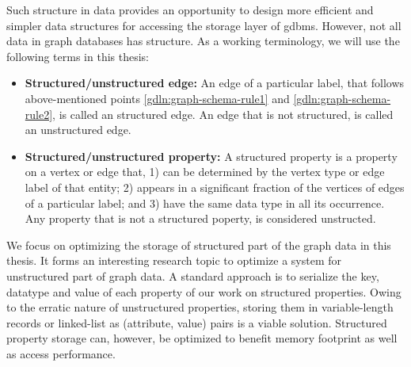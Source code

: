 \begin{guideline}
\begin{enumerate}
\end{enumerate}

Such structure in data provides an opportunity to design more efficient and simpler data structures for accessing the storage layer of \gls{gdbms}. However, not all data in graph databases has structure. As a working terminology, we will use the following terms in this thesis:

\begin{itemize}
	\item \textbf{Structured/unstructured edge:} An edge of a particular label, that follows above-mentioned points \ref{gdln:graph-schema-rule1} and \ref{gdln:graph-schema-rule2}, is called an structured edge. An edge that is not structured, is called an unstructured edge.
	 
	\item \textbf{Structured/unstructured property:} A structured property is a property on a vertex or edge that, 1) can be determined by the vertex type or edge label of that entity; 2) appears in a significant fraction of the vertices of edges of a particular label; and 3) have the same data type in all its occurrence. Any property that is not a structured poperty, is considered unstructed.
	
\end{itemize}

We focus on optimizing the storage of structured part of the graph data in this thesis. It forms an interesting research topic to optimize a system for unstructured part of graph data. A standard approach is to serialize the key, datatype and value of each property  of our work on structured properties. Owing to the erratic nature of unstructured properties, storing them in variable-length records or linked-list as (attribute, value) pairs is a viable solution. Structured property storage can, however, be optimized to benefit memory footprint as well as access performance.

\end{guideline}

